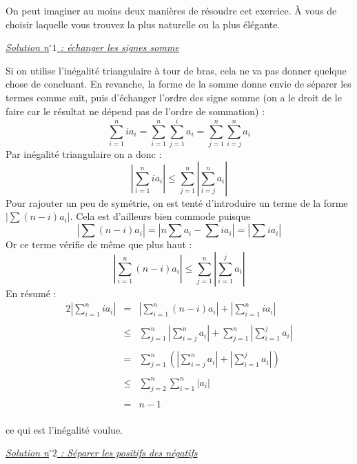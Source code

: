 \begin{sol}
On peut imaginer au moins deux manières de résoudre cet exercice. À vous de choisir laquelle vous trouvez la plus naturelle ou la plus élégante.

\underline{\textit{Solution n$^\circ 1$ : échanger les signes somme}}

Si on utilise l'inégalité triangulaire à tour de bras, cela ne va pas donner quelque chose de concluant. En revanche, la forme de la somme donne envie de séparer les termes comme suit, puis d'échanger l'ordre des signe somme (on a le droit de le faire car le résultat ne dépend pas de l'ordre de sommation) :
$$\sum_{i=1}^{n} ia_i = \sum_{i=1}^n \sum_{j=1}^i a_i = \sum_{j=1}^n \sum_{i=j}^n a_i$$
Par inégalité triangulaire on a donc :
$$\left| \sum_{i=1}^{n} ia_i \right| \le \sum_{j=1}^n \left|\sum_{i=j}^n a_i\right|$$
Pour rajouter un peu de symétrie, on est tenté d'introduire un terme de la forme $|\sum (n-i)a_i|$. Cela est d'ailleurs bien commode puisque
$$|\sum (n-i)a_i| = |n\sum a_i - \sum ia_i| = |\sum ia_i|$$
Or ce terme vérifie de même que plus haut :
$$\left|\sum_{i=1}^n (n-i)a_i\right| \le \sum_{j=1}^n \left|\sum_{i=1}^j a_i \right|$$
En résumé :
$$\begin{array}{lll}
\displaystyle 2 \left| \sum_{i=1}^{n} ia_i \right|
&=&\displaystyle \left| \sum_{i=1}^{n} (n-i)a_i \right|+\left| \sum_{i=1}^{n} ia_i \right| \\
&&\\
& \le & \displaystyle\sum_{j=1}^n \left|\sum_{i=j}^n a_i\right| + \sum_{j=1}^n \left|\sum_{i=1}^j a_i \right| \\
&&\\
&=& \displaystyle\sum_{j=1}^n \left(\left|\sum_{i=j}^n a_i\right|+\left|\sum_{i=1}^j a_i \right|\right) \\
&&\\
&\le & \displaystyle\sum_{j=2}^n \sum_{i=1}^n |a_i|\\
&&\\
&=&n-1\\
\end{array}$$

ce qui est l'inégalité voulue.


\underline{\textit{Solution n$^\circ 2$ : Séparer les positifs des négatifs}}


\end{sol}

